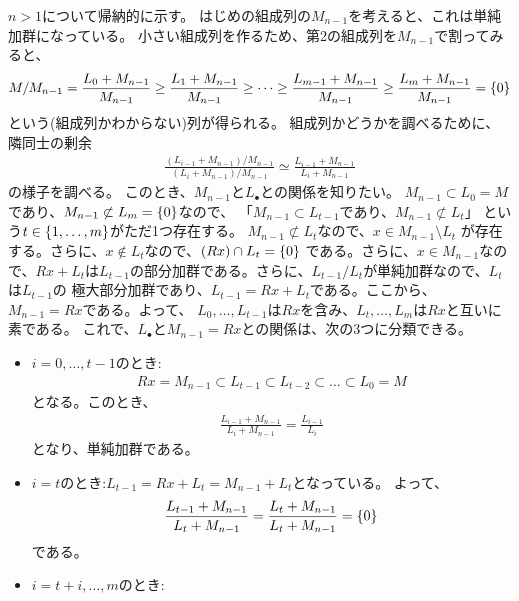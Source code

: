 \documentclass[9pt]{ltjsarticle}
\begin{document}
\begin{myproof}
  $n>1$について帰納的に示す。
  はじめの組成列の$M_{n-1}$を考えると、これは単純加群になっている。
  小さい組成列を作るため、第2の組成列を$M_{n-1}$で割ってみると、
  \begin{align}
    M/M_{n-1}
    =
     \frac{L_0 + M_{n-1}}{M_{n-1}}
     \ge
     \frac{L_1 + M_{n-1}}{M_{n-1}}
     \ge
     \dots
     \ge
     \frac{L_{m-1} + M_{n-1}}{M_{n-1}}
     \ge
     \frac{L_{m} + M_{n-1}}{M_{n-1}}
     =
     \{0\}
     \label{第2の組成列を割ったもの}
  \end{align}
  という(組成列かわからない)列が得られる。
  組成列かどうかを調べるために、隣同士の剰余
  \begin{align}
    \frac{(L_{i-1}+M_{n-1})/M_{n-1}}{(L_{i}+M_{n-1})/M_{n-1}}
    \simeq
    \frac{L_{i-1} + M_{n-1}}{L_{i} + M_{n-1}}
  \end{align}
  の様子を調べる。
  このとき、$M_{n-1}$と$L_\bullet$との関係を知りたい。
  $M_{n-1} \subset L_0 = M$であり、$M_{n-1}\not\subset L_m = \{0\}$なので、
  「$M_{n-1}\subset L_{t-1}$であり、$M_{n-1}\not\subset L_{t}$」
  という$t \in \left\{1,\dots,m\right\}$がただ1つ存在する。
  $M_{n-1}\not\subset L_t$なので、$x\in M_{n-1}\setminus L_t$
  が存在する。さらに、$x\notin L_t$なので、$(Rx)\cap L_{t} = \{0\}$
  である。さらに、$x\in M_{n-1}$なので、$Rx + L_t$は$L_{t-1}$の部分加群である。さらに、$L_{t-1}/L_t$が単純加群なので、$L_t$は$L_{t-1}$の
  極大部分加群であり、$L_{t-1} = Rx + L_t$である。ここから、
  $M_{n-1} = Rx$である。よって、
  $L_0,\dots,L_{t-1}$は$Rx$を含み、$L_t,\dots,L_m$は$Rx$と互いに素である。
  これで、$L_\bullet$と$M_{n-1} = Rx$との関係は、次の3つに分類できる。
  \begin{itemize}
    \item $i=0,\dots,t-1$のとき:
    \begin{align}
      Rx = M_{n-1}\subset L_{t-1} \subset L_{t-2} \subset \dots \subset L_0 = M
    \end{align}
    となる。このとき、
    \begin{align}
      \frac{L_{i-1} + M_{n-1}}{L_i + M_{n-1}} = \frac{L_{i-1}}{L_i}
    \end{align}
    となり、単純加群である。
    \item $i=t$のとき:$L_{t-1} = Rx + L_t = M_{n-1} + L_t$となっている。
    よって、
    \begin{align}
      \frac{L_{t-1}+M_{n-1}}{L_t + M_{n-1}} =
      \frac{L_t + M_{n-1}}{L_t + M_{n-1}}
      =
      \{0\}
    \end{align}
    である。
    \item $i=t+i,\dots,m$のとき:

\end{itemize}
\end{myproof}
\end{document}
